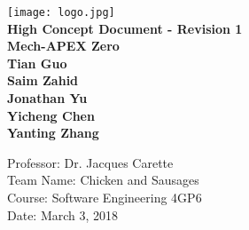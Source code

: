 \documentclass{article}
\begin{document}

\begin{titlepage}
    \begin{center}
        \vspace*{1cm}
        \texttt{[image: logo.jpg]}
        \\
        \textbf{\Large High Concept Document - Revision 1}
        \vspace{0.5cm}
        \textbf{\Large  \\Mech-APEX Zero}
        \vspace{1cm}
        \textbf{\\Tian Guo\\Saim Zahid\\Jonathan Yu\\ Yicheng Chen \\Yanting Zhang }
        \vfill
        \vspace{0.8cm}
        \begin{flushright}
        Professor: Dr. Jacques Carette\\
        Team Name: Chicken and Sausages\\
        Course: Software Engineering 4GP6\\
        Date: March 3, 2018
        \end{flushright}
    \end{center}
\end{titlepage}
\end{document}

